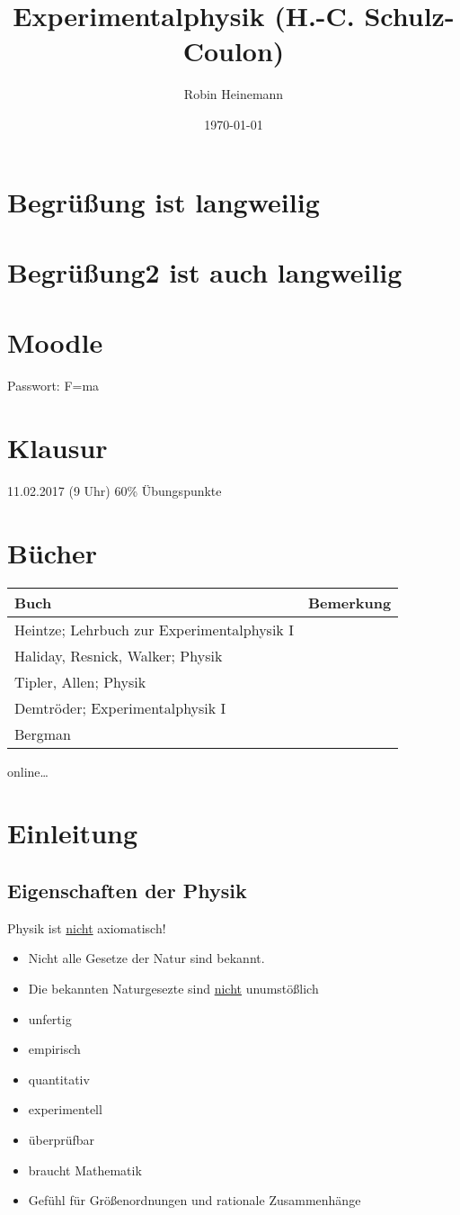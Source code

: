 \documentclass[11pt]{article}
\author{Robin Heinemann}
\date{\today}
\title{Experimentalphysik (H.-C. Schulz-Coulon)}
\begin{document}
\maketitle
\tableofcontents


\section{Begrüßung ist langweilig}
\label{sec-1}
\section{Begrüßung2 ist auch langweilig}
\label{sec-2}
\section{Moodle}
\label{sec-3}
Passwort: F=ma
\section{Klausur}
\label{sec-4}
11.02.2017 (9 Uhr)
60\% Übungspunkte
\section{Bücher}
\label{sec-5}
\begin{center}
\begin{tabular}{ll}
Buch & Bemerkung\\
\hline
Heintze; Lehrbuch zur Experimentalphysik I & \\
Haliday, Resnick, Walker; Physik & \\
Tipler, Allen; Physik & \\
Demtröder; Experimentalphysik I & \\
Bergman & \\
\end{tabular}
\end{center}

online\ldots{}
\section{Einleitung}
\label{sec-6}
\subsection{Eigenschaften der Physik}
\label{sec-6-1}
Physik ist \uline{nicht} axiomatisch!
\begin{itemize}
\item Nicht alle Gesetze der Natur sind bekannt.
\item Die bekannten Naturgesezte sind \uline{nicht} unumstößlich
\item unfertig
\item empirisch
\item quantitativ
\item experimentell
\item überprüfbar
\item braucht Mathematik
\item Gefühl für Größenordnungen und rationale Zusammenhänge
\end{itemize}
\end{document}
